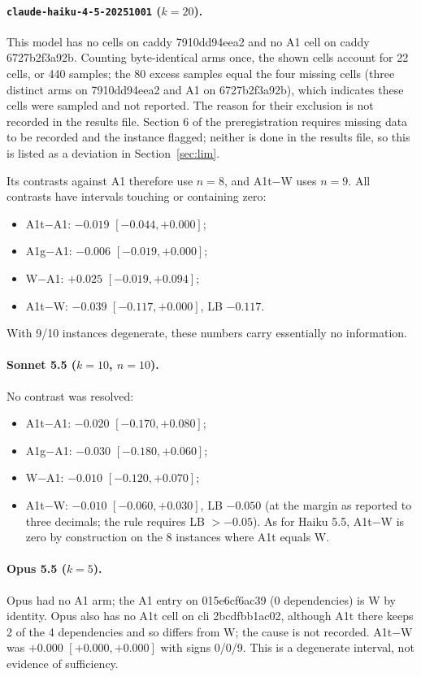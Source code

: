 \paragraph{\texttt{claude-haiku-4-5-20251001} ($k=20$).} This model has no cells on caddy 7910dd94eea2 and no A1 cell on caddy 6727b2f3a92b. Counting byte-identical arms once, the shown cells account for 22 cells, or 440 samples; the 80 excess samples equal the four missing cells (three distinct arms on 7910dd94eea2 and A1 on 6727b2f3a92b), which indicates these cells were sampled and not reported. The reason for their exclusion is not recorded in the results file. Section 6 of the preregistration requires missing data to be recorded and the instance flagged; neither is done in the results file, so this is listed as a deviation in Section~\ref{sec:lim}.

Its contrasts against A1 therefore use $n=8$, and A1t$-$W uses $n=9$. All contrasts have intervals touching or containing zero:
\begin{itemize}
\item A1t$-$A1: $-0.019$ $[-0.044, +0.000]$;
\item A1g$-$A1: $-0.006$ $[-0.019, +0.000]$;
\item W$-$A1: $+0.025$ $[-0.019, +0.094]$;
\item A1t$-$W: $-0.039$ $[-0.117, +0.000]$, LB $-0.117$.
\end{itemize}
With 9/10 instances degenerate, these numbers carry essentially no information.

\paragraph{Sonnet 5.5 ($k=10$, $n=10$).} No contrast was resolved:
\begin{itemize}
\item A1t$-$A1: $-0.020$ $[-0.170, +0.080]$;
\item A1g$-$A1: $-0.030$ $[-0.180, +0.060]$;
\item W$-$A1: $-0.010$ $[-0.120, +0.070]$;
\item A1t$-$W: $-0.010$ $[-0.060, +0.030]$, LB $-0.050$ (at the margin as reported to three decimals; the rule requires LB $> -0.05$). As for Haiku 5.5, A1t$-$W is zero by construction on the 8 instances where A1t equals W.
\end{itemize}

\paragraph{Opus 5.5 ($k=5$).} Opus had no A1 arm; the A1 entry on 015e6cf6ac39 (0 dependencies) is W by identity. Opus also has no A1t cell on cli 2bcdfbb1ac02, although A1t there keeps 2 of the 4 dependencies and so differs from W; the cause is not recorded. A1t$-$W was $+0.000$ $[+0.000, +0.000]$ with signs 0/0/9. This is a degenerate interval, not evidence of sufficiency.

